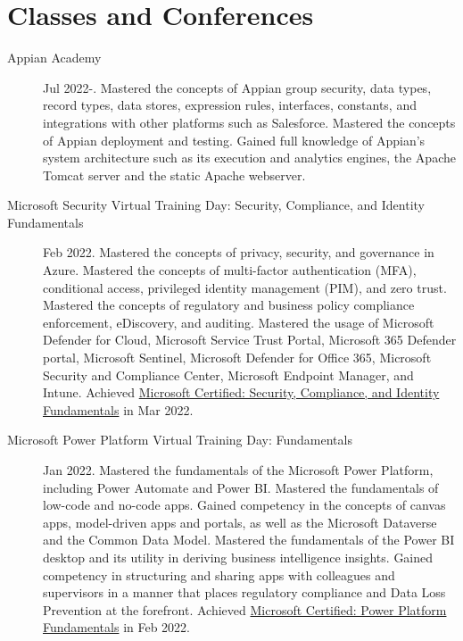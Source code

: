 \documentclass{article}
\begin{document}
\vspace{-1em}
\section*{Classes and Conferences}\vspace{-0.5em}
\begin{description}
  \item [Appian Academy] Jul 2022-. Mastered the concepts of Appian group security, data types, record types, data stores, expression rules, interfaces, constants, and integrations with other platforms such as Salesforce. Mastered the concepts of Appian deployment and testing. Gained full knowledge of Appian's system architecture such as its execution and analytics engines, the Apache Tomcat server and the static Apache webserver.
  \item [Microsoft Security Virtual Training Day: Security, Compliance, and Identity Fundamentals] Feb 2022. Mastered the concepts of privacy, security, and governance in Azure. Mastered the concepts of multi-factor authentication (MFA), conditional access, privileged identity management (PIM), and zero trust. Mastered the concepts of regulatory and business policy compliance enforcement, eDiscovery, and auditing. Mastered the usage of Microsoft Defender for Cloud, Microsoft Service Trust Portal, Microsoft 365 Defender portal, Microsoft Sentinel, Microsoft Defender for Office 365, Microsoft Security and Compliance Center, Microsoft Endpoint Manager, and Intune. Achieved \href{https://www.credly.com/badges/606ab01b-911d-4408-a6a8-303b121d4fc8/public_url}{Microsoft Certified: Security, Compliance, and Identity Fundamentals} in Mar 2022.
  \item [Microsoft Power Platform Virtual Training Day: Fundamentals] Jan 2022. Mastered the fundamentals of the Microsoft Power Platform, including Power Automate and Power BI. Mastered the fundamentals of low-code and no-code apps. Gained competency in the concepts of canvas apps, model-driven apps and portals, as well as the Microsoft Dataverse and the Common Data Model. Mastered the fundamentals of the Power BI desktop and its utility in deriving business intelligence insights. Gained competency in structuring and sharing apps with colleagues and supervisors in a manner that places regulatory compliance and Data Loss Prevention at the forefront. Achieved \href{https://www.credly.com/badges/eeabb8f3-4c51-431e-9174-1528f4ecd6d3/public_url}{Microsoft Certified: Power Platform Fundamentals} in Feb 2022.

\end{description}
\end{document}
